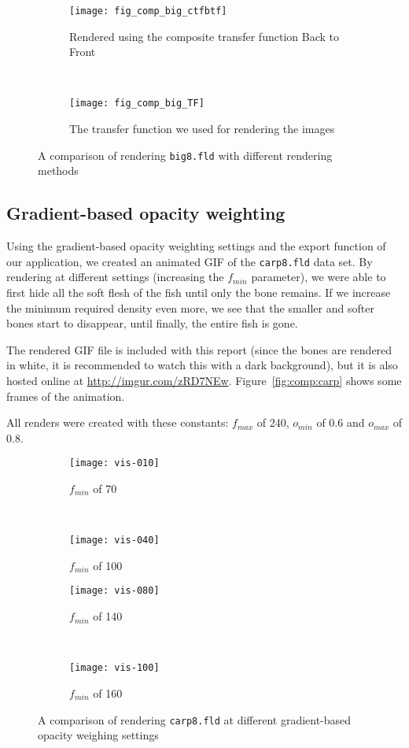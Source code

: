\begin{figure}[H]
	\ContinuedFloat
	\centering
	\begin{subfigure}[t]{0.45\textwidth}
		\texttt{[image: fig\_comp\_big\_ctfbtf]}
		\caption{Rendered using the composite transfer function Back to Front}
	\end{subfigure}
	~%
	\begin{subfigure}[t]{0.45\textwidth}
		\texttt{[image: fig\_comp\_big\_TF]}
		\caption{The transfer function we used for rendering the images}
	\end{subfigure}
	
	\caption{A comparison of rendering \texttt{big8.fld} with different rendering methods}
	\label{fig:comp:big}
\end{figure}	

\subsection{Gradient-based opacity weighting}
Using the gradient-based opacity weighting settings and the export function of our application, we created an animated GIF of the \texttt{carp8.fld} data set.
By rendering at different settings (increasing the $f_{min}$ parameter), we were able to first hide all the soft flesh of the fish until only the bone remains.
If we increase the minimum required density even more, we see that the smaller and softer bones start to disappear, until finally, the entire fish is gone.

The rendered GIF file is included with this report (since the bones are rendered in white, it is recommended to watch this with a dark background), but it is also hosted online at \url{http://imgur.com/zRD7NEw}.
Figure~\ref{fig:comp:carp} shows some frames of the animation.

All renders were created with these constants: $f_{max}$ of 240, $o_{min}$ of $0.6$ and $o_{max}$ of $0.8$.

\begin{figure}[H]
	\centering
	\begin{subfigure}[t]{0.45\textwidth}
		\texttt{[image: vis-010]}
		\caption{$f_{min}$ of 70}
	\end{subfigure}
	~%
	\begin{subfigure}[t]{0.45\textwidth}
		\texttt{[image: vis-040]}
		\caption{$f_{min}$ of 100}
	\end{subfigure}
	
	\begin{subfigure}[t]{0.45\textwidth}
		\texttt{[image: vis-080]}
		\caption{$f_{min}$ of 140}
	\end{subfigure}
	~%
	\begin{subfigure}[t]{0.45\textwidth}
		\texttt{[image: vis-100]}
		\caption{$f_{min}$ of 160}
	\end{subfigure}
	\caption{A comparison of rendering \texttt{carp8.fld} at different gradient-based opacity weighing settings}
	\label{fig:comp:big}
\end{figure}
	
